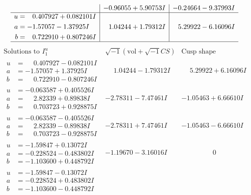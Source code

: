 \documentclass[1p]{elsarticle_modified}
\theoremstyle{definition}
\newcommand{\I}{\sqrt{-1}}
\begin{document}
$$\begin{array}{c|c|c}
 & -0.96055 + 5.90753 I & -0.24664 - 9.37993 I \\ \hline\begin{aligned}
u &= \phantom{-}0.407927 + 0.082101 I \\
a &= -1.57057 - 1.37925 I \\
b &= \phantom{-}0.722910 + 0.807246 I\end{aligned}
 & \phantom{-}1.04244 + 1.79312 I & \phantom{-}5.29922 - 6.16096 I\\
 \hline 
 \end{array}$$\newpage$$\begin{array}{c|c|c}  
\text{Solutions to }I^u_{1}& \I (\text{vol} + \sqrt{-1}CS) & \text{Cusp shape}\\
 \hline 
\begin{aligned}
u &= \phantom{-}0.407927 - 0.082101 I \\
a &= -1.57057 + 1.37925 I \\
b &= \phantom{-}0.722910 - 0.807246 I\end{aligned}
 & \phantom{-}1.04244 - 1.79312 I & \phantom{-}5.29922 + 6.16096 I \\ \hline\begin{aligned}
u &= -0.063587 + 0.405526 I \\
a &= \phantom{-}2.82339 + 0.89838 I \\
b &= \phantom{-}0.703723 + 0.928875 I\end{aligned}
 & -2.78311 - 7.47461 I & -1.05463 + 6.66610 I \\ \hline\begin{aligned}
u &= -0.063587 - 0.405526 I \\
a &= \phantom{-}2.82339 - 0.89838 I \\
b &= \phantom{-}0.703723 - 0.928875 I\end{aligned}
 & -2.78311 + 7.47461 I & -1.05463 - 6.66610 I \\ \hline\begin{aligned}
u &= -1.59847 + 0.13072 I \\
a &= -0.228524 - 0.483802 I \\
b &= -1.103600 + 0.448792 I\end{aligned}
 & -1.19670 - 3.16016 I & \phantom{-0.000000 } 0 \\ \hline\begin{aligned}
u &= -1.59847 - 0.13072 I \\
a &= -0.228524 + 0.483802 I \\
b &= -1.103600 - 0.448792 I\end{aligned}

\end{array}$$
\end{document}
